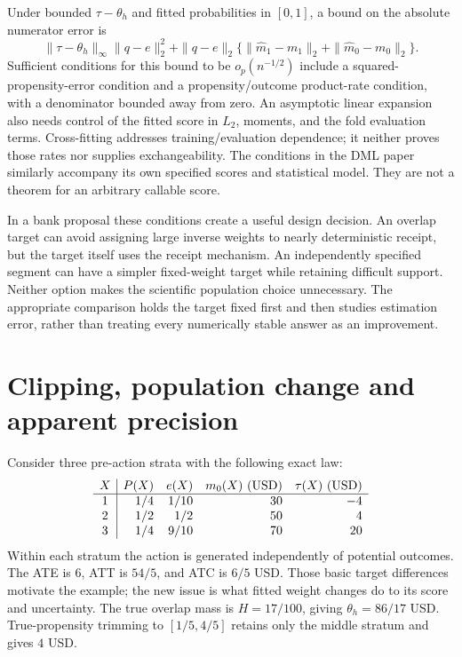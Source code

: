 Under bounded $\tau-\theta_h$ and fitted probabilities in $[0,1]$, a bound
on the absolute numerator error is
\[
 \|\tau-\theta_h\|_\infty\|q-e\|_2^2+
 \|q-e\|_2\{\|\widehat m_1-m_1\|_2+
                          \|\widehat m_0-m_0\|_2\}.
\]
Sufficient conditions for this bound to be $o_p(n^{-1/2})$ include a
squared-propensity-error condition and a propensity/outcome product-rate
condition, with a denominator bounded away from zero. An asymptotic linear
expansion also needs control of the fitted score in $L_2$, moments, and the
fold evaluation terms. Cross-fitting addresses training/evaluation dependence;
it neither proves those rates nor supplies exchangeability. The conditions in
the DML paper similarly accompany its own specified scores and statistical
model. They are not a theorem for an arbitrary callable score.~\citep{dml2018,doubleml2022}

In a bank proposal these conditions create a useful design decision. An
overlap target can avoid assigning large inverse weights to nearly deterministic
receipt, but the target itself uses the receipt mechanism. An independently
specified segment can have a simpler fixed-weight target while retaining
difficult support. Neither option makes the scientific population choice
unnecessary. The appropriate comparison holds the target fixed first and
then studies estimation error, rather than treating every numerically stable
answer as an improvement.

\section{Clipping, population change and apparent precision}
\label{exec17:s4-clipping}

Consider three pre-action strata with the following exact law:
\[
\begin{array}{c|rrrr}
 X& P(X)&e(X)&m_0(X)\ ({\rm USD})&\tau(X)\ ({\rm USD})\\ \hline
 1&1/4&1/10&30&-4\\
 2&1/2&1/2&50&4\\
 3&1/4&9/10&70&20
\end{array}
\]
Within each stratum the action is generated independently of potential
outcomes. The ATE is $6$, ATT is $54/5$, and ATC is $6/5$ USD. Those basic
target differences motivate the example; the new issue is what fitted
weight changes do to its score and uncertainty. The true overlap mass is
$H=17/100$, giving $\theta_h=86/17$ USD. True-propensity trimming to
$[1/5,4/5]$ retains only the middle stratum and gives $4$ USD.
\citep{exec17_s4_math}

